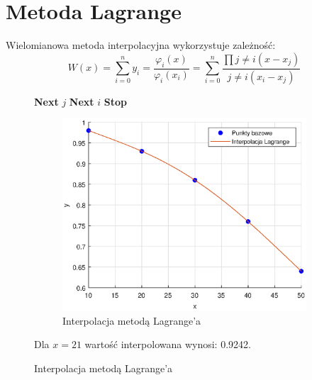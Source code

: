 \documentclass{article}
\begin{document}
\section{Metoda Lagrange}
Wielomianowa metoda interpolacyjna wykorzystuje zależność:
$$W(x) = \sum^n_{i=0}y_i=\frac{\varphi_i(x)}{\varphi_i(x_i)} = \sum^n_{i=0}\frac{\prod j \neq i (x - x_j)}{j \neq i (x_i - x_j)}$$
\begin{figure}[H]
    \begin{multicols}{2}
        \null \vfill
        \begin{algorithm}[H]
        \caption{Wstępny algorytm lagrange}\label{euclid}
        \begin{algorithmic}[1]
                        \EndIf
                        \State \textbf{Next} $j$
                    \EndFor
                    \State \textbf{Next} $i$
                \EndFor
                \State \textbf{Stop}
            \EndProcedure
        \end{algorithmic}
\end{algorithm}
        \vfill \null
        \par
        \begin{figure}[H]
            \centering
            \includegraphics[width=\linewidth]{newImg/lagrange.eps}
        \caption{Interpolacja metodą Lagrange'a}
            \label{fig:my_label}
        \end{figure}
Dla $x = 21$ wartość interpolowana wynosi: 0.9242.
    \end{multicols}
\end{figure}
\end{document}
